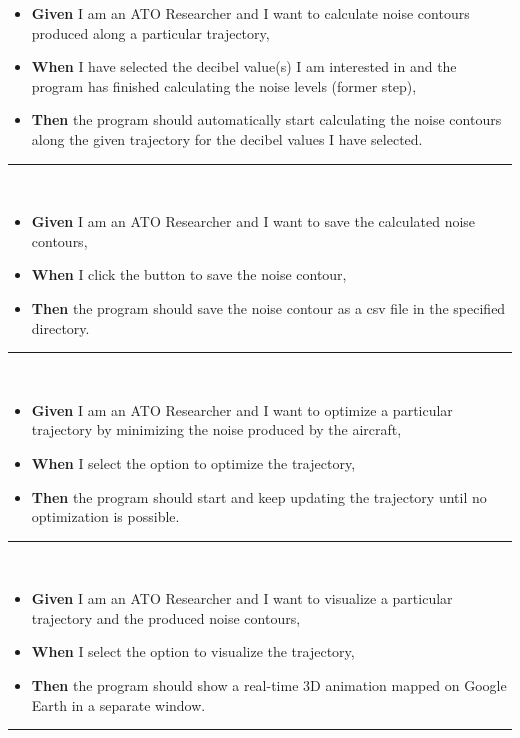 \begin{itemize}
\item \textbf{Given} I am an ATO Researcher and I want to calculate noise contours produced along a particular trajectory,
\item \textbf{When} I have selected the decibel value(s) I am interested in and the program has finished calculating the noise levels (former step),
\item \textbf{Then} the program should automatically start calculating the noise contours along the given trajectory for the decibel values I have selected.
\end{itemize}
\noindent\rule{8cm}{0.4pt} \\
\begin{itemize}
\item \textbf{Given} I am an ATO Researcher and I want to save the calculated noise contours,
\item \textbf{When} I click the button to save the noise contour,
\item \textbf{Then} the program should save the noise contour as a csv file in the specified directory.
\end{itemize}
\noindent\rule{8cm}{0.4pt} \\
\begin{itemize}
\item \textbf{Given} I am an ATO Researcher and I want to optimize a particular trajectory by minimizing the noise produced by the aircraft,
\item \textbf{When} I select the option to optimize the trajectory,
\item \textbf{Then} the program should start and keep updating the trajectory until no optimization is possible.
\end{itemize}
\noindent\rule{8cm}{0.4pt} \\
\begin{itemize}
\item \textbf{Given} I am an ATO Researcher and I want to visualize a particular trajectory and the produced noise contours,
\item \textbf{When} I select the option to visualize the trajectory,
\item \textbf{Then} the program should show a real-time 3D animation mapped on Google Earth in a separate window.\\
\end{itemize}
\noindent\rule{8cm}{0.4pt} \\

